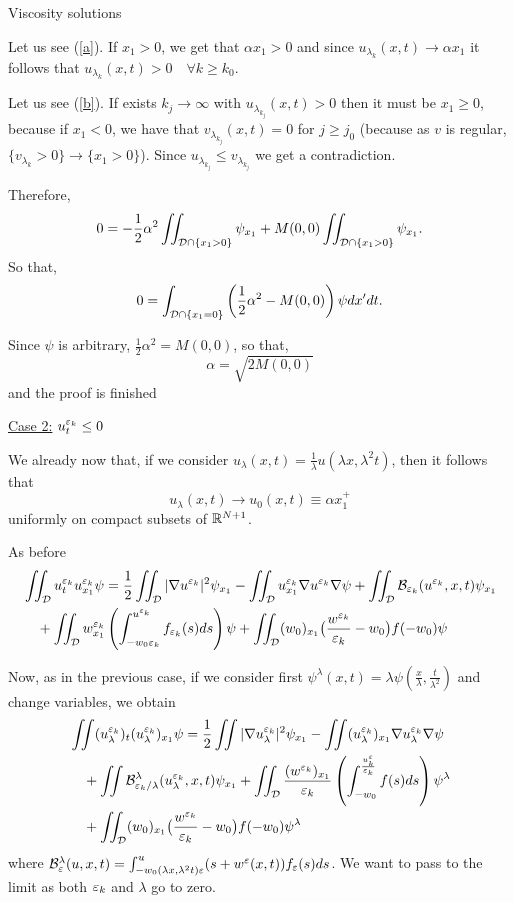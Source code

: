 \begin{section}{Viscosity solutions}
\begin{pf}
Let us see (\ref{a}). If $x_1>0$, we get that $\alpha x_1>0$ and since 
$u_{\lambda_k}(x,t)\to\alpha x_1$ it follows that $u_{\lambda_k}(x,t)>0\quad 
\forall k\ge k_0$.

Let us see (\ref{b}). If exists $k_j\to\infty$ with 
$u_{\lambda_{k_j}}(x,t)>0$ then it must be $x_1\ge0$, because if $x_1<0$, 
we have that $v_{\lambda_{k_j}}(x,t)=0$ for $j\ge j_0$ (because as $v$ is regular, 
$\{ v_{\lambda_k}>0 \}\to \{ x_1>0 \}$). Since $u_{\lambda_{k_j}}\le 
v_{\lambda_{k_j}}$ we get a contradiction.

\medskip

Therefore, 
$$0 = -\frac12\alpha^2\iint_{{\cal D}\cap\{x_1>0\}}\psi_{x_1} + 
M(0,0)\iint_{{\cal D}\cap\{x_1>0\}}\psi_{x_1}.$$
So that, 
$$0=\int_{{\cal D}\cap\{x_1=0\}}\left(\frac12\alpha^2 - M(0,0)\right)\psi dx'dt.$$

Since $\psi$ is arbitrary, $\frac12\alpha^2 = M(0,0)$, so that, 
$$\alpha = \sqrt{2M(0,0)}$$
and the proof is finished

\medskip

\underline{Case 2:} $u^{\varepsilon_k}_t\le 0$
\medskip

We already now that, if we consider $u_{\lambda}(x,t) = \frac{1}{\lambda}
u(\lambda x,\lambda^2 t)$, then it follows that
$$u_{\lambda}(x,t)\to u_0(x,t)\equiv \alpha x_1^+$$
uniformly on compact subsets of ${\Bbb R}^{N+1}$.

As before
\begin{align*}
&\iint_{\cal D} u^{\varepsilon_k}_t u^{\varepsilon_k}_{x_1}\psi = \frac12 
\iint_{\cal D}|\nabla u^{\varepsilon_k}|^2\psi_{x_1} - \iint_{\cal D} u^{\varepsilon_k}_{x_1}
\nabla u^{\varepsilon_k}\nabla\psi
 + \iint_{\cal D}{{\cal B}}_{\varepsilon_k}(u^{\varepsilon_k},x,t)\psi_{x_1}\\
& \quad+ \iint_{\cal D} w^{\varepsilon_k}_{x_1}\left(\int_{-w_0\varepsilon_k}^{u^{\varepsilon_k}} 
f_{\varepsilon_k}(s) ds\right)\psi+\iint_{{\cal D}}(w_0)_{x_1}\big(\frac{w^{\varepsilon_k}}{{\varepsilon_k}}-w_0\big)
f(-w_0)\psi
\end{align*}

Now, as in the previous case, if we consider first $\psi^{\lambda}(x,t) = 
\lambda\psi(\frac{x}{\lambda},\frac{t}{\lambda^2})$ and change variables, 
we obtain
\begin{equation}
\label{velam}
\begin{aligned}
&\iint (u^{\varepsilon_k}_{\lambda})_t (u^{\varepsilon_k}_{\lambda})_{x_1}\psi = 
\frac12 \iint|\nabla u^{\varepsilon_k}_{\lambda}|^2\psi_{x_1} - 
\iint (u^{\varepsilon_k}_{\lambda})_{x_1}\nabla u^{\varepsilon_k}_{\lambda}
\nabla\psi\\
&\quad + \iint{{\cal B}}^\lambda_{\varepsilon_k/\lambda}(u^{\varepsilon_k}_{\lambda}, x,
 t)\psi_{x_1}
 + \iint_{{\cal D}}\frac{ (w^{\varepsilon_k})_{x_1}}{{\varepsilon_k}}\left(\int_{-w_0}
^{\frac{u^\varepsilon_k}{{\varepsilon_k}}} 
f(s) ds\right)\psi^\lambda\\
&\quad+\iint_{{\cal D}}(w_0)_{x_1}\big(\frac{w^{\varepsilon_k}}{{\varepsilon_k}}-w_0\big)f(-w_0)\psi^\lambda
\end{aligned}
\end{equation}
where ${\cal B}_\varepsilon^\lambda(u,x,t)=\int_{-w_0(\lambda x,\lambda^2 t)\varepsilon}^{u}
(s+{w^\varepsilon}(x,t))f_{\varepsilon}(s)ds$.
\medskip
We want to pass to the limit as both $\varepsilon_k$ and $\lambda$ go to zero.


\end{pf}
\end{section}

